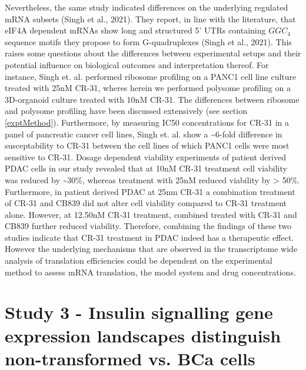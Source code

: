 \documentclass[12pt,openany]{book}
\begin{document}
Nevertheless, the same study indicated differences on the underlying
regulated mRNA subsets (Singh et al., 2021). They report, in line with
the literature, that eIF4A dependent mRNAs show long and structured 5'
UTRs containing \(GGC_4\) sequence motifs they propose to form
G-quadruplexes (Singh et al., 2021). This raises some questions about
the differences between experimental setups and their potential
influence on biological outcomes and interpretation thereof. For
instance, Singh et. al. performed ribosome profiling on a PANC1 cell
line culture treated with 25nM CR-31, wheres herein we performed
polysome profiling on a 3D-organoid culture treated with 10nM CR-31. The
differences between ribosome and polysome profiling have been discussed
extensively (see section \ref{exptMethod}). Furthermore, by measuring
IC50 concentrations for CR-31 in a panel of pancreatic cancer cell
lines, Singh et. al. show a \textasciitilde{}6-fold difference in
susceptability to CR-31 between the cell lines of which PANC1 cells were
most sensitive to CR-31. Dosage dependent viability experiments of
patient derived PDAC cells in our study revealed that at 10nM CR-31
treatment cell viability was reduced by \textasciitilde{}30\%, whereas
treatment with 25nM reduced viability by \textgreater{} 50\%.
Furthermore, in patient derived PDAC at 25nm CR-31 a combination
treatment of CR-31 and CB839 did not alter cell viability compared to
CR-31 treatment alone. However, at 12.50nM CR-31 treatment, combined
treated with CR-31 and CB839 further reduced viability. Therefore,
combining the findings of these two studies indicate that CR-31
treatment in PDAC indeed has a therapeutic effect. However the
underlying mechanisms that are observed in the transcriptome wide
analysis of translation efficiencies could be dependent on the
experimental method to assess mRNA translation, the model system and
drug concentrations. \newline
\section{Study 3 - Insulin signalling gene expression landscapes distinguish non-transformed vs. BCa cells}
\end{document}

